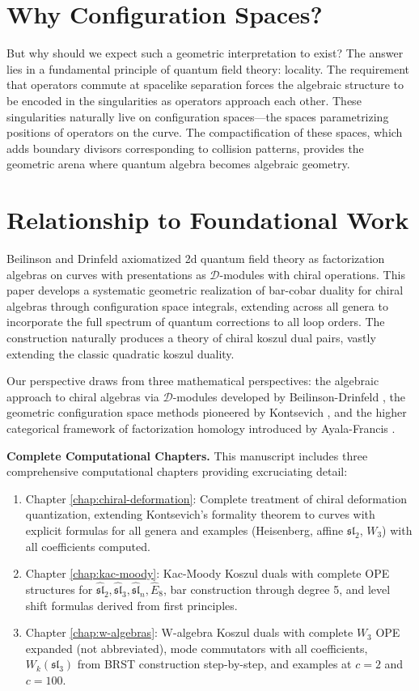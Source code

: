 \section{Why Configuration Spaces?}

But why should we expect such a geometric interpretation to exist? The answer lies in a fundamental principle of quantum field theory: locality. The requirement that operators commute at spacelike separation forces the algebraic structure to be encoded in the singularities as operators approach each other. These singularities naturally live on configuration spaces—the spaces parametrizing positions of operators on the curve. The compactification of these spaces, which adds boundary divisors corresponding to collision patterns, provides the geometric arena where quantum algebra becomes algebraic geometry.

\section{Relationship to Foundational Work}

Beilinson and Drinfeld \cite{BD04} axiomatized 2d quantum field theory as factorization algebras on curves with presentations as $\mathcal{D}$-modules with chiral operations. This paper develops a systematic geometric realization of bar-cobar duality for chiral algebras through configuration space integrals, extending across all genera to incorporate the full spectrum of quantum corrections to all loop orders. The construction naturally produces a theory of chiral koszul dual pairs, vastly extending the classic quadratic koszul duality.

Our perspective draws from three mathematical perspectives: the algebraic approach to chiral algebras via $\mathcal{D}$-modules developed by Beilinson-Drinfeld \cite{BD04}, the geometric configuration space methods pioneered by Kontsevich \cite{Kon94, Kon99}, and the higher categorical framework of factorization homology introduced by Ayala-Francis \cite{AF15}.

\medskip
\noindent
\textbf{Complete Computational Chapters.} This manuscript includes three comprehensive computational chapters providing excruciating detail:
\begin{enumerate}
\item Chapter \ref{chap:chiral-deformation}: Complete treatment of chiral deformation quantization, extending Kontsevich's formality theorem to curves with explicit formulas for all genera and examples (Heisenberg, affine $\mathfrak{sl}_2$, $W_3$) with all coefficients computed.
\item Chapter \ref{chap:kac-moody}: Kac-Moody Koszul duals with complete OPE structures for $\widehat{\mathfrak{sl}}_2, \widehat{\mathfrak{sl}}_3, \widehat{\mathfrak{sl}}_n, \widehat{E}_8$, bar construction through degree 5, and level shift formulas derived from first principles.
\item Chapter \ref{chap:w-algebras}: W-algebra Koszul duals with complete $W_3$ OPE expanded (not abbreviated), mode commutators with all coefficients, $W_k(\mathfrak{sl}_3)$ from BRST construction step-by-step, and examples at $c=2$ and $c=100$.
\end{enumerate}

